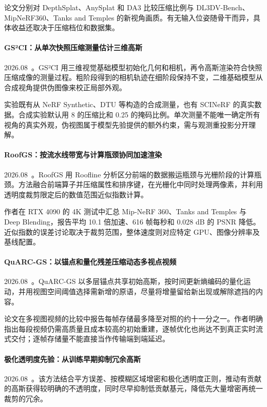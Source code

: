 论文分别对 DepthSplat、AnySplat 和 DA3 比较压缩比例与 DL3DV-Bench、MipNeRF360、Tanks and Temples 的新视角画质。有无输入位姿随骨干而异，具体收益还取决于压缩档位和数据集。

\paragraph{GS²CI：从单次快照压缩测量估计三维高斯}
2026.08~\cite{2608_13502}。GS²CI 用三维视觉基础模型初始化几何和相机，再令高斯渲染符合快照压缩成像的测量过程。粗阶段得到的相机轨迹在细阶段保持不变，二维基础模型从合成视角提供伪图像来校正局部外观。

实验既有从 NeRF Synthetic、DTU 等构造的合成测量，也有 SCINeRF 的真实数据。合成实验默认用 8 的压缩比和 0.25 的掩码比例。单次测量不能唯一确定所有视角的真实外观，伪视图属于模型先验提供的额外约束，需与观测重投影分开理解。

\paragraph{RoofGS：按流水线带宽与计算瓶颈协同加速渲染}
2026.08~\cite{2608_15785}。RoofGS 用 Roofline 分析区分前端的数据搬运瓶颈与光栅阶段的计算瓶颈。方法融合前端算子并压缩属性和排序键，在光栅化中同时处理两像素，并利用透明度裁剪限定后的数值范围近似指数计算。

作者在 RTX 4090 的 4K 测试中汇总 Mip-NeRF 360、Tanks and Temples 与 Deep Blending，报告平均 10.1 倍加速、616 帧每秒和 0.028 dB 的 PSNR 降低。近似指数的误差讨论取决于裁剪范围，整体速度则对应特定 GPU、图像分辨率及基线配置。

\paragraph{QuARC-GS：以锚点和量化残差压缩动态多视点视频}
2026.08~\cite{2608_18285}。QuARC-GS 以多层锚点共享初始高斯，按时间更新熵编码的量化运动，并用视图空间阈值选择需新增的原语，尽量将增量留给新出现或解除遮挡的内容。

论文在多视图视频的比较中报告每帧存储最多降至对照的约十一分之一。作者明确指出每段视频仍需高质量且成本较高的初始重建，逐帧优化也尚达不到真正实时流式交付；逐帧存储量不能直接当作传输端到端延迟。

\paragraph{极化透明度先验：从训练早期抑制冗余高斯}
2026.08~\cite{2608_22344}。该方法结合平方误差、按模糊区域增密和极化透明度正则，推动有贡献的高斯获得较明确的不透明度，同时尽早抑制低贡献基元，降低先大量增密再统一裁剪的冗余。

